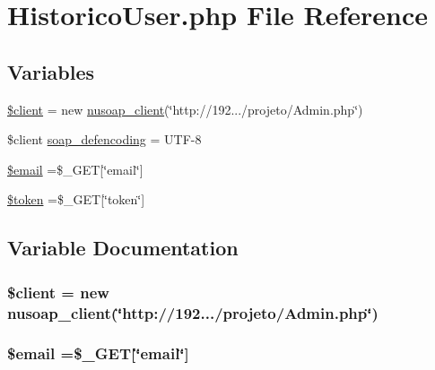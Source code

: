 \hypertarget{_historico_user_8php}{}\section{Historico\+User.\+php File Reference}
\label{_historico_user_8php}
\subsection*{Variables}
\begin{DoxyCompactItemize}
\item 
\hyperlink{_historico_user_8php_ad1405dc1ba2e288764378e79bff7a87d}{\$client} = new \hyperlink{classnusoap__client}{nusoap\+\_\+client}(\char`\"{}http\+://192.../projeto/Admin.\+php\char`\"{})
\item 
\$client \hyperlink{_historico_user_8php_a944cce1b9c1aa5e93c77ace20ce99989}{soap\+\_\+defencoding} = \textquotesingle{}U\+T\+F-\/8\textquotesingle{}
\item 
\hyperlink{_historico_user_8php_ad634f418b20382e2802f80532d76d3cd}{\$email} =\$\+\_\+\+G\+E\+T\mbox{[}\char`\"{}email\char`\"{}\mbox{]}
\item 
\hyperlink{_historico_user_8php_a00ae4fcafb1145f5e968bdf920f83e2e}{\$token} =\$\+\_\+\+G\+E\+T\mbox{[}\char`\"{}token\char`\"{}\mbox{]}
\end{DoxyCompactItemize}


\subsection{Variable Documentation}
\hypertarget{_historico_user_8php_ad1405dc1ba2e288764378e79bff7a87d}{}
\subsubsection[{\$client}]{\setlength{\rightskip}{0pt plus 5cm}\$client = new {\bf nusoap\+\_\+client}(\char`\"{}http\+://192.../projeto/Admin.\+php\char`\"{})}\label{_historico_user_8php_ad1405dc1ba2e288764378e79bff7a87d}
\hypertarget{_historico_user_8php_ad634f418b20382e2802f80532d76d3cd}{}
\subsubsection[{\$email}]{\setlength{\rightskip}{0pt plus 5cm}\$email =\$\+\_\+\+G\+E\+T\mbox{[}\char`\"{}email\char`\"{}\mbox{]}}\label{_historico_user_8php_ad634f418b20382e2802f80532d76d3cd}
\hypertarget{_historico_user_8php_a00ae4fcafb1145f5e968bdf920f83e2e}{}
